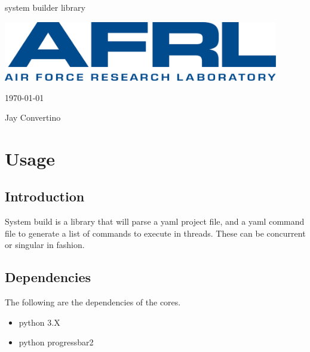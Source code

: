 \begin{titlepage}
  \begin{center}

  {\Huge system builder library}

  \vspace{25mm}

  \includegraphics[width=0.90\textwidth,height=\textheight,keepaspectratio]{img/AFRL.png}

  \vspace{25mm}

  \today

  \vspace{15mm}

  {\Large Jay Convertino}

  \end{center}
\end{titlepage}

\tableofcontents

\newpage

\section{Usage}

\subsection{Introduction}

\par
System build is a library that will parse a yaml project file, and a yaml command
file to generate a list of commands to execute in threads. These can be concurrent
or singular in fashion.

\subsection{Dependencies}

\par
The following are the dependencies of the cores.

\begin{itemize}
  \item python 3.X
  \item python progressbar2
\end{itemize}

